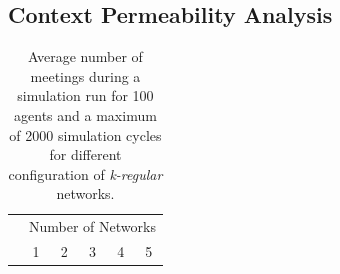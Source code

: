 \clearpage


\renewcommand\thefigure{\thesection.\arabic{figure}}    
\setcounter{figure}{0}   

\renewcommand\thetable{\thesection.\arabic{table}}    
\setcounter{table}{0}     


\begin{landscape}
	\section{Context Permeability Analysis}
	\label{append_ctx_permeability}
	\vspace{-0.1cm}
\begin{table}[H]
	\centering
\begin{minipage}{0.9\linewidth}	
	\caption{Average number of meetings during a simulation run for 100 agents and a maximum of 2000 simulation cycles for different configuration of \textit{k-regular} networks.}
	\label{append_tab:enc_ctx_permeability_k}
\end{minipage}

\renewcommand{\arraystretch}{0.85}
\begin{tabular}{lcccccccccc}
	\toprule
	& \multicolumn{10}{c}{Number of Networks} \\ 
	& \multicolumn{2}{c}{1} & \multicolumn{2}{c}{2} & \multicolumn{2}{c}{3} & \multicolumn{2}{c}{4} & \multicolumn{2}{c}{5} \\ 
	

\end{tabular}
\end{table}
\end{landscape}
